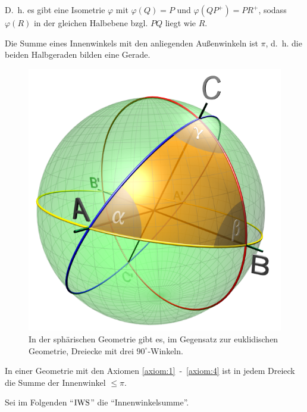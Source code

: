 D.~h. es gibt eine Isometrie $\varphi$ mit $\varphi(Q) = P$
und $\varphi(QP^+) = PR^+$, sodass $\varphi(R)$ in der gleichen
Halbebene bzgl. $PQ$ liegt wie $R$.

\begin{beweis}
    Die Summe eines Innenwinkels mit den anliegenden Außenwinkeln ist
    $\pi$, d.~h. die beiden Halbgeraden bilden eine Gerade.
\end{beweis}

\begin{figure}[htp]
    \centering
    \includegraphics[width=0.4\linewidth, keepaspectratio]{figures/Spherical_triangle_3d_opti.png} 
    \caption{In der sphärischen Geometrie gibt es, im Gegensatz zur euklidischen Geometrie, Dreiecke mit drei $90^\circ$-Winkeln.}
    \label{fig:spherical-triangle}
\end{figure}

\begin{proposition}\label{prop:14.11}%
    In einer Geometrie mit den Axiomen \ref{axiom:1}~-~\ref{axiom:4}
    ist in jedem Dreieck die Summe der Innenwinkel $\leq \pi$.
\end{proposition}

Sei im Folgenden \enquote{$\operatorname{IWS}$} die \enquote{Innenwinkelsumme}.


